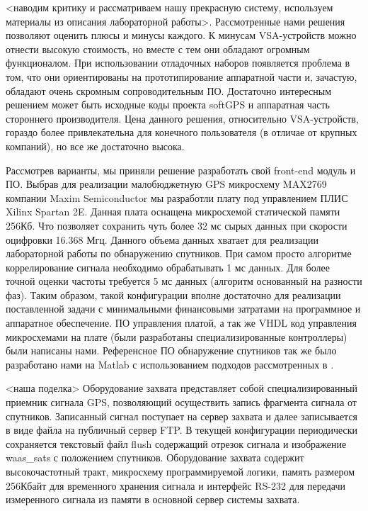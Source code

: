 \documentclass[a4paper,12pt]{article}
\numberwithin{equation}{section}		%
\numberwithin{table}{section}
\begin{document}
<наводим критику и рассматриваем нашу прекрасную систему, используем материалы из описания лабораторной работы>.
Рассмотренные нами решения позволяют оценить плюсы и минусы каждого. К минусам VSA-устройств можно отнести высокую стоимость, но вместе с тем они обладают огромным функционалом. При использовании отладочных наборов появляется проблема в том, что они ориентированы на прототипирование аппаратной части и, зачастую, обладают очень скромным сопроводительным ПО. Достаточно интересным решением может быть исходные коды проекта softGPS и аппаратная часть стороннего производителя. Цена данного решения, относительно VSA-устройств, гораздо более привлекательна для конечного пользователя (в отличае от крупных компаний), но все же достаточно высока.

Рассмотрев варианты, мы приняли решение разработать свой front-end модуль и ПО. Выбрав для реализации малобюджетную GPS микросхему MAX2769 компании Maxim Semiconductor мы разработли плату под управлением ПЛИС Xilinx Spartan 2E. Данная плата оснащена микросхемой статической памяти 256Кб. Что позволяет сохранить чуть более 32 мс сырых данных при скорости оцифровки 16.368 Мгц. Данного объема данных хватает для реализации лабораторной работы по обнаружению спутников. При самом просто алгоритме коррелирование сигнала необходимо обрабатывать 1 мс данных. Для более точной оценки частоты требуется 5 мс данных (алгоритм основанный на разности фаз). Таким образом, такой конфигурации вполне достаточно для реализации поставленной задачи с минимальными финансовыми затратами на программное и аппаратное обеспечение. ПО управления платой, а так же VHDL код управления микросхемами на плате (были разработаны специализированные контроллеры) были написаны нами. Референсное ПО обнаружение спутников так же было разработано нами на Matlab с использованием подходов рассмотренных в \cite{tsui}.

<наша поделка>
Оборудование захвата представляет собой специализированный приемник сигнала GPS, позволяющий осуществить запись фрагмента сигнала от спутников. Записанный сигнал поступает на сервер захвата и далее записывается в виде файла на публичный сервер FTP. В текущей конфигурации \cite{gpsproject} периодически сохраняется текстовый файл flush содержащий отрезок сигнала и изображение waas\_sats с положением спутников. Оборудование захвата содержит высокочастотный тракт, микросхему программируемой логики, память размером 256Кбайт для временного хранения сигнала и интерфейс RS-232 для передачи измеренного сигнала из памяти в основной сервер системы захвата.
\end{document}

